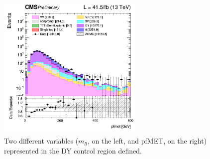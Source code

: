 \documentclass[a4paper, 10pt, openright]{report}
\begin{document}
\begin{figure}[htbp]
{\begin{minipage}[b]{.48\textwidth}
\end{minipage}\hfill
\begin{minipage}[b]{.48\textwidth}
\includegraphics[width=7cm, height=7cm]{figs/log_cratio_dyCR_ll_METcorrected_pt_2017.png}
\end{minipage} \hfill
}
\caption{Two different variables ($m_{ll}$, on the left, and pf\ac{MET}, on the right) represented in the \ac{DY} control region defined.}
\label{fig:DYCR2}
\end{figure}
\end{document}
